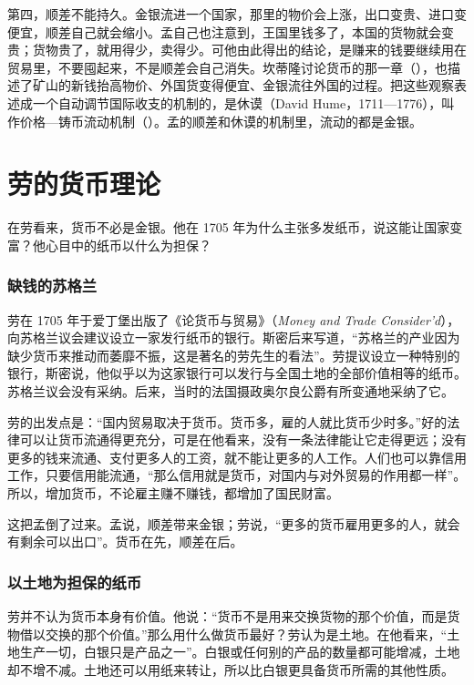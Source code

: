 第四，顺差不能持久。金银流进一个国家，那里的物价会上涨，出口变贵、进口变便宜，顺差自己就会缩小。孟自己也注意到，王国里钱多了，本国的货物就会变贵；货物贵了，就用得少，卖得少。可他由此得出的结论，是赚来的钱要继续用在贸易里，不要囤起来，不是顺差会自己消失\cite{mun1664}。坎蒂隆讨论货币的那一章（），也描述了矿山的新钱抬高物价、外国货变得便宜、金银流往外国的过程\cite{cantillon1755}。把这些观察表述成一个自动调节国际收支的机制的，是休谟（David Hume，1711—1776），叫作价格—铸币流动机制（）。孟的顺差和休谟的机制里，流动的都是金银。

\section{劳的货币理论}\label{sec:merc-law}

在劳看来，货币不必是金银。他在 1705 年为什么主张多发纸币，说这能让国家变富？他心目中的纸币以什么为担保？

\subsubsection{缺钱的苏格兰}
劳在 1705 年于爱丁堡出版了《论货币与贸易》（\emph{Money and Trade Consider'd}），向苏格兰议会建议设立一家发行纸币的银行。斯密后来写道，“苏格兰的产业因为缺少货币来推动而萎靡不振，这是著名的劳先生的看法”。劳提议设立一种特别的银行，斯密说，他似乎以为这家银行可以发行与全国土地的全部价值相等的纸币。苏格兰议会没有采纳。后来，当时的法国摄政奥尔良公爵有所变通地采纳了它\cite{smith1776}。

劳的出发点是：“国内贸易取决于货币。货币多，雇的人就比货币少时多。”好的法律可以让货币流通得更充分，可是在他看来，没有一条法律能让它走得更远；没有更多的钱来流通、支付更多人的工资，就不能让更多的人工作。人们也可以靠信用工作，只要信用能流通，“那么信用就是货币，对国内与对外贸易的作用都一样”。所以，增加货币，不论雇主赚不赚钱，都增加了国民财富\cite{law1705}。

这把孟倒了过来。孟说，顺差带来金银；劳说，“更多的货币雇用更多的人，就会有剩余可以出口”\cite{law1705}。货币在先，顺差在后。

\subsubsection{以土地为担保的纸币}
劳并不认为货币本身有价值。他说：“货币不是用来交换货物的那个价值，而是货物借以交换的那个价值。”\cite{law1705}那么用什么做货币最好？劳认为是土地。在他看来，“土地生产一切，白银只是产品之一”。白银或任何别的产品的数量都可能增减，土地却不增不减。土地还可以用纸来转让，所以比白银更具备货币所需的其他性质\cite{law1705}。

